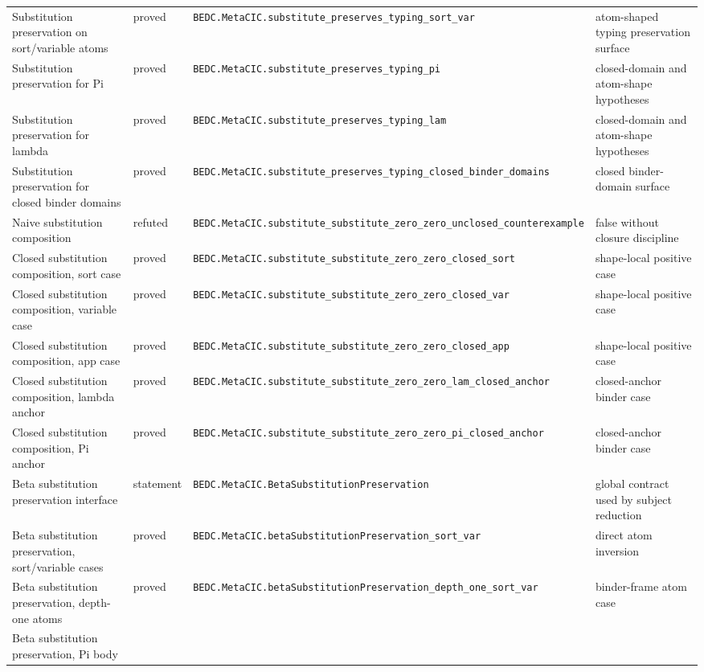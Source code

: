\begin{longtable}{p{}p{}p{}p{}}
Substitution preservation on sort/variable atoms &
proved &
\texttt{BEDC.MetaCIC.substitute\_preserves\_typing\_sort\_var} &
atom-shaped typing preservation surface\\
Substitution preservation for Pi &
proved &
\texttt{BEDC.MetaCIC.substitute\_preserves\_typing\_pi} &
closed-domain and atom-shape hypotheses\\
Substitution preservation for lambda &
proved &
\texttt{BEDC.MetaCIC.substitute\_preserves\_typing\_lam} &
closed-domain and atom-shape hypotheses\\
Substitution preservation for closed binder domains &
proved &
\texttt{BEDC.MetaCIC.substitute\_preserves\_typing\_closed\_binder\_domains} &
closed binder-domain surface\\
Naive substitution composition &
refuted &
\texttt{BEDC.MetaCIC.substitute\_substitute\_zero\_zero\_unclosed\_counterexample} &
false without closure discipline\\
Closed substitution composition, sort case &
proved &
\texttt{BEDC.MetaCIC.substitute\_substitute\_zero\_zero\_closed\_sort} &
shape-local positive case\\
Closed substitution composition, variable case &
proved &
\texttt{BEDC.MetaCIC.substitute\_substitute\_zero\_zero\_closed\_var} &
shape-local positive case\\
Closed substitution composition, app case &
proved &
\texttt{BEDC.MetaCIC.substitute\_substitute\_zero\_zero\_closed\_app} &
shape-local positive case\\
Closed substitution composition, lambda anchor &
proved &
\texttt{BEDC.MetaCIC.substitute\_substitute\_zero\_zero\_lam\_closed\_anchor} &
closed-anchor binder case\\
Closed substitution composition, Pi anchor &
proved &
\texttt{BEDC.MetaCIC.substitute\_substitute\_zero\_zero\_pi\_closed\_anchor} &
closed-anchor binder case\\
Beta substitution preservation interface &
statement &
\texttt{BEDC.MetaCIC.BetaSubstitutionPreservation} &
global contract used by subject reduction\\
Beta substitution preservation, sort/variable cases &
proved &
\texttt{BEDC.MetaCIC.betaSubstitutionPreservation\_sort\_var} &
direct atom inversion\\
Beta substitution preservation, depth-one atoms &
proved &
\texttt{BEDC.MetaCIC.betaSubstitutionPreservation\_depth\_one\_sort\_var} &
binder-frame atom case\\
Beta substitution preservation, Pi body &

\end{longtable}
